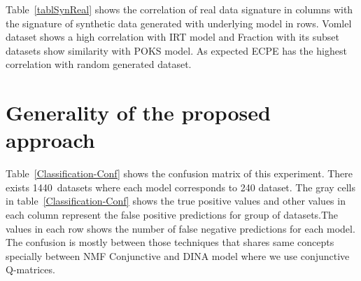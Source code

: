 Table~\ref{tablSynReal} shows the correlation of real data signature in columns with the signature of synthetic data generated with underlying model in rows. Vomlel dataset shows a high correlation with IRT model and Fraction with its subset datasets show similarity with POKS model. As expected ECPE has the highest correlation with random generated dataset.







\section{Generality of the proposed approach}

Table~\ref{Classification-Conf} shows the confusion matrix of this experiment. There exists 1440~datasets where each model corresponds to 240 dataset. The gray cells in table~\ref{Classification-Conf} shows the true positive values and other values in each column represent the false positive predictions for group of datasets.The values in each row shows the number of false negative predictions for each model. The confusion is mostly between those techniques that shares same concepts specially between NMF Conjunctive and DINA model where we use conjunctive Q-matrices. 


